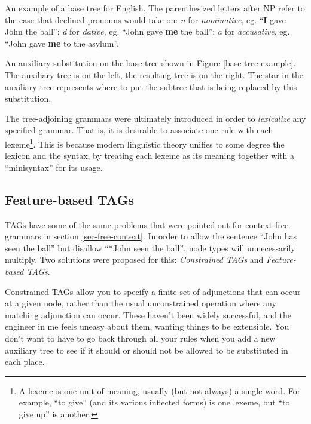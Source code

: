 \documentclass[12pt]{article}
\newcommand{\defn}[1]{\textit{#1}}
\begin{document}
\begin{Figure}
\begin{center}
\end{center}
\caption{An example of a base tree for English.  The parenthesized
letters after NP refer to the case that declined pronouns would take on:
\textit{n} for \defn{nominative}, eg. ``\textbf{I} gave John the
ball''; \textit{d} for \defn{dative}, eg. ``John gave \textbf{me} the
ball''; \textit{a} for \defn{accusative}, eg.  ``John gave \textbf{me}
to the asylum''.}
\label{base-tree-example}
\end{Figure}

\begin{Figure}
\begin{center}
\end{center}
\caption{An auxiliary substitution on the base tree shown in Figure
\ref{base-tree-example}.  The auxiliary tree is on the left, the
resulting tree is on the right.  The star in the auxiliary tree
represents where to put the subtree that is being replaced by this
substitution.}
\label{adjoining-substitution}
\end{Figure}

The tree-adjoining grammars were ultimately introduced in order to
\defn{lexicalize} any specified grammar.  That is, it is desirable to
associate one rule with each lexeme\footnote{A lexeme is one unit of
meaning, usually (but not always) a single word.  For example, ``to
give'' (and its various inflected forms) is one lexeme, but ``to give
up'' is another.}.  This is because modern linguistic theory unifies to
some degree the lexicon and the syntax, by treating each lexeme as its
meaning together with a ``minisyntax'' for its usage.

\subsection{Feature-based TAGs}
\label{subsec-feature-tags}

TAGs have some of the same problems that were pointed out for
context-free grammars in section \ref{sec-free-context}.  In order to
allow the sentence ``John has seen the ball'' but disallow ``*John seen
the ball'', node types will unnecessarily multiply.  Two solutions were
proposed for this: \defn{Constrained TAGs} and \defn{Feature-based
TAGs}.

Constrained TAGs allow you to specify a finite set of adjunctions that
can occur at a given node, rather than the usual unconstrained operation
where any matching adjunction can occur.  These haven't been widely
successful, and the engineer in me feels uneasy about them, wanting
things to be extensible.  You don't want to have to go back through all
your rules when you add a new auxiliary tree to see if it should or
should not be allowed to be substituted in each place.
\end{document}
